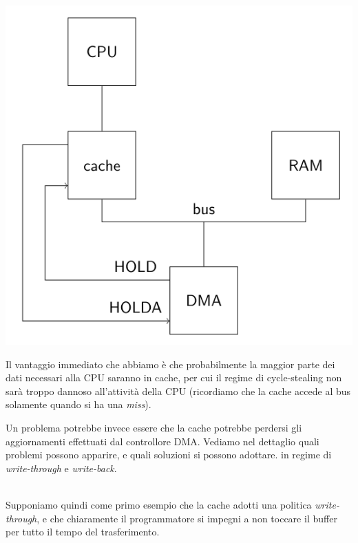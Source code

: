 \documentclass[a4paper,11pt]{article}
\begin{document}
\begin{center}
	\includegraphics[scale=0.5]{../figures/dma_cache.png}
\end{center}

Il vantaggio immediato che abbiamo è che probabilmente la maggior parte dei dati necessari alla CPU saranno in cache, per cui il regime di cycle-stealing non sarà troppo dannoso all'attività della CPU (ricordiamo che la cache accede al bus solamente quando si ha una \textit{miss}).

Un problema potrebbe invece essere che la cache potrebbe perdersi gli aggiornamenti effettuati dal controllore DMA.
Vediamo nel dettaglio quali problemi possono apparire, e quali soluzioni si possono adottare. in regime di \textit{write-through} e \textit{write-back}.

\par\smallskip
\noindent
\textbf{} \\
Supponiamo quindi come primo esempio che la cache adotti una politica \textit{write-through}, e che chiaramente il programmatore si impegni a non toccare il buffer per tutto il tempo del trasferimento.
\end{document}
